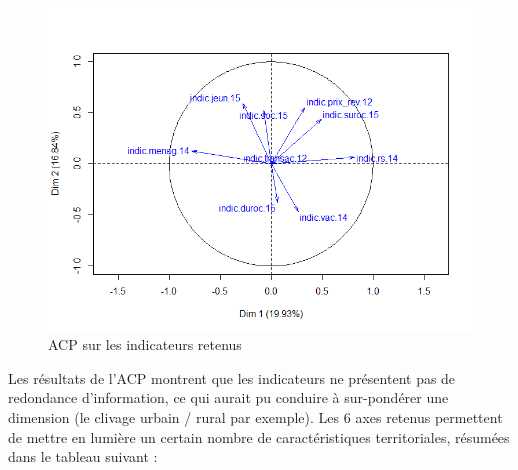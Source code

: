 \documentclass[12pt, a4paper]{article}
\begin{document}
\begin{center}
\begin{figure}[H]
\caption{ACP sur les indicateurs retenus}
\includegraphics[scale=.7]{img/ACP.png}
\end{figure}
\end{center}

Les résultats de l'ACP montrent que les indicateurs ne présentent pas de redondance d'information, ce qui aurait pu conduire à sur-pondérer une dimension (le clivage urbain / rural par exemple). Les 6 axes retenus permettent de mettre en lumière un certain nombre de caractéristiques territoriales, résumées dans le tableau suivant : \\
\end{document}
